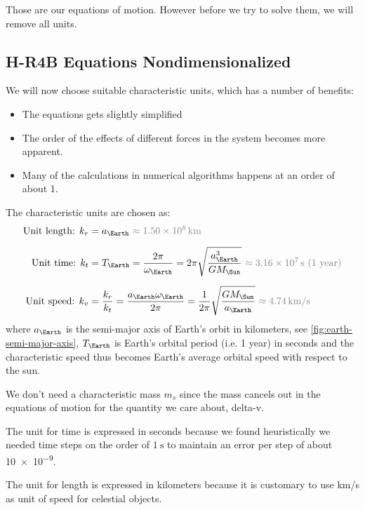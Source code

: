 Those are our equations of motion. However before we try to solve them, we will remove all units.

\subsection{H-R4B Equations Nondimensionalized}
We will now choose suitable characteristic units, which has a number of benefits:
\begin{itemize}
    \item The equations gets slightly simplified
    \item The order of the effects of different forces in the system becomes more apparent.
    \item Many of the calculations in numerical algorithms happens at an order of about 1. 
\end{itemize}

The characteristic units are chosen as:
\begin{align}
    \text{Unit length: } k_r &= a_{\Earth}\ {\color{gray} \approx \SI{1.50e8}{\km}}  \\[0.2cm]
    \text{Unit time: } k_t &= T_{\Earth} = \frac{2\pi}{\omega_\Earth} = 2\pi \sqrt{\frac{a_\Earth^3}{G M_\Sun}}\ {\color{gray} \approx \SI{3.16e7}{\s} \text{ (1 year)}} \\[0.2cm]
    \text{Unit speed: } k_v &= \frac{k_r}{k_t} = \frac{a_\Earth \omega_\Earth}{2\pi} = \frac{1}{2\pi} \sqrt{\frac{G M_\Sun}{a_\Earth}}\ {\color{gray} \approx \SI{4.74}{\km/\s}}
\end{align}
where \(a_\Earth\) is the semi-major axis of Earth's orbit in kilometers, see \cref{fig:earth-semi-major-axis}, \(T_\Earth\) is Earth's orbital period (i.e. 1 year) in seconds and the characteristic speed thus becomes Earth's average orbital speed with respect to the sun.

We don't need a characteristic mass \(m_s\) since the mass cancels out in the equations of motion for the quantity we care about, delta-v.

The unit for time is expressed in seconds because we found heuristically we needed time steps on the order of \(\SI{1}{\s}\) to maintain an error per step of about \num{10e-9}.

The unit for length is expressed in kilometers because it is customary to use \si{\km/\s} as unit of speed for celestial objects.

